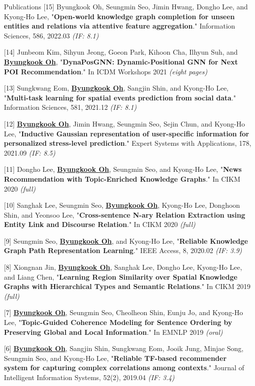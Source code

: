 \documentclass{resume} %
\newcommand{\me}[1]{\underline{\textbf{#1}}}  %
\begin{document}
\begin{rSection}{Publications}
		[15] Byungkook Oh, Seungmin Seo, Jimin Hwang, Dongho Lee, and Kyong-Ho Lee, "\textbf{Open-world knowledge graph completion for unseen entities and relations via attentive feature aggregation}." Information Sciences, 586, 2022.03 \textit{(IF: 8.1)}

		[14] Junbeom Kim, Sihyun Jeong, Goeon Park, Kihoon Cha, Ilhyun Suh, and \me{Byungkook Oh}, "\textbf{DynaPosGNN: Dynamic-Positional GNN for Next POI Recommendation}." In ICDM Workshops 2021 \textit{(eight pages)}

		[13] Sungkwang Eom, \me{Byungkook Oh}, Sangjin Shin, and Kyong-Ho Lee, "\textbf{Multi-task learning for spatial events prediction from social data}." Information Sciences, 581, 2021.12 \textit{(IF: 8.1)}

		[12] \me{Byungkook Oh}, Jimin Hwang, Seungmin Seo, Sejin Chun, and Kyong-Ho Lee, "\textbf{Inductive Gaussian representation of user-specific information for personalized stress-level prediction}." Expert Systems with Applications, 178, 2021.09 \textit{(IF: 8.5)}
		
		[11] Dongho Lee, \me{Byungkook Oh}, Seungmin Seo, and Kyong‑Ho Lee, "\textbf{News Recommendation with Topic‑Enriched Knowledge Graphs}." In CIKM 2020 \textit{(full)}

		[10] Sanghak Lee, Seungmin Seo, \me{Byungkook Oh}, Kyong-Ho Lee, Donghoon Shin, and Yeonsoo Lee, "\textbf{Cross-sentence N-ary Relation Extraction using Entity Link and Discourse Relation}." In CIKM 2020 \textit{(full)}

		[9] Seungmin Seo, \me{Byungkook Oh}, and Kyong-Ho Lee, "\textbf{Reliable Knowledge Graph Path Representation Learning}." IEEE Access, 8, 2020.02 \textit{(IF: 3.9)}

		[8] Xiongnan Jin, \me{Byungkook Oh}, Sanghak Lee, Dongho Lee, Kyong-Ho Lee, and Liang Chen, "\textbf{Learning Region Similarity over Spatial Knowledge Graphs with Hierarchical Types and Semantic Relations}." In CIKM 2019 \textit{(full)}

		[7] \me{Byungkook Oh}, Seungmin Seo, Cheolheon Shin, Eunju Jo, and Kyong-Ho Lee, "\textbf{Topic-Guided Coherence Modeling for Sentence Ordering by Preserving Global and Local Information}." In EMNLP 2019 \textit{(oral)}
		
		[6] \me{Byungkook Oh}, Sangjin Shin, Sungkwang Eom, Jooik Jung, Minjae Song, Seungmin Seo, and Kyong-Ho
		Lee, "\textbf{Reliable TF-based recommender system for capturing complex correlations among contexts}." Journal of Intelligent Information Systems, 52(2), 2019.04 \textit{(IF: 3.4)}
		

\end{rSection}
\end{document}
